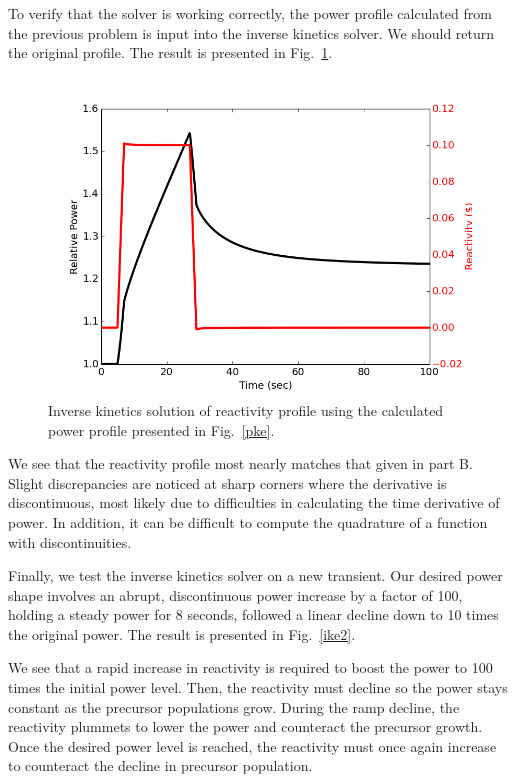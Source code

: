 \documentclass[12pt]{report}
\begin{document}
	To verify that the solver is working correctly, the power profile calculated from the previous problem is input into the inverse kinetics solver. We should return the original profile. The result is presented in Fig.~\ref{ike1}.

	\begin{figure}[h!]
		\begin{center}
			\includegraphics[scale=0.7]{partC_ex.png}
		\end{center}
		\caption{Inverse kinetics solution of reactivity profile using the calculated power profile presented in Fig.~\ref{pke}.}
		\label{ike1}
	\end{figure}
	 
	\newpage
	We see that the reactivity profile most nearly matches that given in part B. Slight discrepancies are noticed at sharp corners where the derivative is discontinuous, most likely due to difficulties in calculating the time derivative of power. In addition, it can be difficult to compute the quadrature of a function with discontinuities. 
	
	Finally, we test the inverse kinetics solver on a new transient. Our desired power shape involves an abrupt, discontinuous power increase by a factor of 100, holding a steady power for 8 seconds, followed a linear decline down to 10 times the original power. The result is presented in Fig.~\ref{ike2}.
	
	We see that a rapid increase in reactivity is required to boost the power to 100 times the initial power level. Then, the reactivity must decline so the power stays constant as the precursor populations grow. During the ramp decline, the reactivity plummets to lower the power and counteract the precursor growth. Once the desired power level is reached, the reactivity must once again increase to counteract the decline in precursor population.
\end{document}
